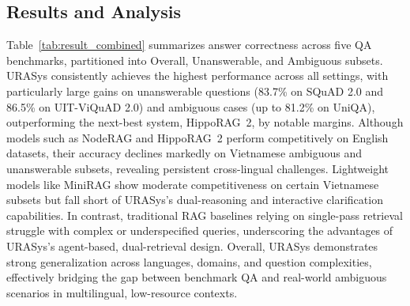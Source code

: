 \documentclass[11pt]{article}
\begin{document}
\begin{table}[t]
\centering
\caption{
Ablation study results across five QA datasets under the LLM-as-a-Judge protocol. 
}
\label{tab:ablation}
\end{table}




\subsection{Results and Analysis}

Table~\ref{tab:result_combined} summarizes answer correctness across five QA benchmarks, partitioned into Overall, Unanswerable, and Ambiguous subsets. URASys consistently achieves the highest performance across all settings, with particularly large gains on unanswerable questions (83.7\% on SQuAD 2.0 and 86.5\% on UIT-ViQuAD 2.0) and ambiguous cases (up to 81.2\% on UniQA), outperforming the next-best system, HippoRAG~2, by notable margins. Although models such as NodeRAG and HippoRAG~2 perform competitively on English datasets, their accuracy declines markedly on Vietnamese ambiguous and unanswerable subsets, revealing persistent cross-lingual challenges. Lightweight models like MiniRAG show moderate competitiveness on certain Vietnamese subsets but fall short of URASys’s dual-reasoning and interactive clarification capabilities. In contrast, traditional RAG baselines relying on single-pass retrieval struggle with complex or underspecified queries, underscoring the advantages of URASys’s agent-based, dual-retrieval design. Overall, URASys demonstrates strong generalization across languages, domains, and question complexities, effectively bridging the gap between benchmark QA and real-world ambiguous scenarios in multilingual, low-resource contexts.
\end{document}
